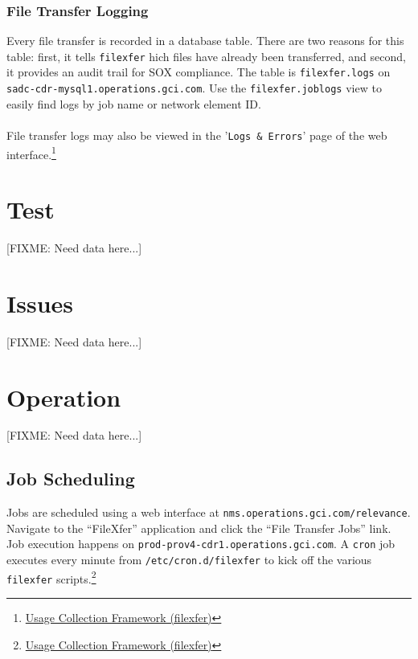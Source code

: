 \documentclass[12pt,letterpaper,dvips]{article}
\newcommand{\FIXME}[1]{\textsf{[FIXME: #1]}}
\begin{document}
\subsubsection{File Transfer Logging}
Every file transfer is recorded in a database table. There are
two reasons for this table: first, it tells \texttt{filexfer}
hich files have already been transferred, and second, it
provides an audit trail for SOX compliance. The table is
\texttt{filexfer.logs} on
\texttt{sadc-cdr-mysql1.operations.gci.com}. Use the
\texttt{filexfer.joblogs} view to easily find logs by job name
or network element ID.\\
\\
File transfer logs may also be viewed in the
'\texttt{Logs \& Errors}' page of the web interface.\footnote{\href{http://oss-wiki.operations.gci.com/dev/index.php/Usage_Collection\_Framework\_(filexfer)}{Usage Collection Framework (filexfer)}}


\newpage
\section{Test}
\FIXME{Need data here...}


\newpage
\section{Issues}
\FIXME{Need data here...}


\newpage
\section{Operation}
\FIXME{Need data here...}


\subsection{Job Scheduling}
Jobs are scheduled using a web interface at
\texttt{nms.operations.gci.com/relevance}.  Navigate to the
``FileXfer'' application and click the ``File Transfer Jobs'' link.
Job execution happens on \texttt{prod-prov4-cdr1.operations.gci.com}.
A \texttt{cron} job executes every minute from
\texttt{/etc/cron.d/filexfer} to kick off the various \texttt{filexfer}
scripts.\footnote{\href{http://oss-wiki.operations.gci.com/dev/index.php/Usage\_Collection\_Framework\_(filexfer)}{Usage
    Collection Framework (filexfer)}}
\end{document}
